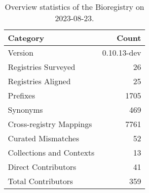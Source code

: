 \begin{table}
\caption{Overview statistics of the Bioregistry on 2023-08-23.}
\label{tab:bioregistry-summary}
\begin{tabular}{lr}
\toprule
Category & Count \\
\midrule
Version & 0.10.13-dev \\
Registries Surveyed & 26 \\
Registries Aligned & 25 \\
Prefixes & 1705 \\
Synonyms & 469 \\
Cross-registry Mappings & 7761 \\
Curated Mismatches & 52 \\
Collections and Contexts & 13 \\
Direct Contributors & 41 \\
Total Contributors & 359 \\
\bottomrule
\end{tabular}
\end{table}
